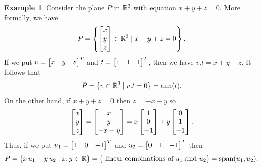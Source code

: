 \documentclass[reqno]{amsart}
\theoremstyle{definition}
\newtheorem{example}[theorem]{Example}
\begin{document}
\begin{example}\label{eg-span-ann-i}
 Consider the plane $P$ in ${\mathbb{R}}^3$ with equation $x+y+z=0$.  More
 formally, we have
 \[ P = \left\{\left[\begin{matrix} x\\ y\\ z\end{matrix}\right] \in{\mathbb{R}}^3\;|\; x+y+z= 0\right\}.  \]
 If we put $v=\left[\begin{matrix} x&y&z\end{matrix}\right]^T$ and $t=\left[\begin{matrix} 1&1&1\end{matrix}\right]^T$, then we have
 $v.t=x+y+z$.  It follows that
 \[ P = \{v\in{\mathbb{R}}^3\;|\; v.t=0\} = \operatorname{ann}(t). \]
 On the other hand, if $x+y+z=0$ then $z=-x-y$ so
 \[ \left[\begin{matrix} x\\y\\z\end{matrix}\right] =
    \left[\begin{matrix} x\\y\\-x-y\end{matrix}\right] = x\left[\begin{matrix} 1\\ 0\\-1\end{matrix}\right] + y\left[\begin{matrix} 0\\1\\-1\end{matrix}\right].
 \]
 Thus, if we put $u_1=\left[\begin{matrix} 1&0&-1\end{matrix}\right]^T$ and $u_2=\left[\begin{matrix} 0&1&-1\end{matrix}\right]^T$
 then
 \[ P = \{x\,u_1+y\,u_2\;|\; x,y\in{\mathbb{R}}\} =
     \{\text{ linear combinations of } u_1 \text{ and } u_2\} =
      \operatorname{span}(u_1,u_2).
 \]
\end{example}
\end{document}
